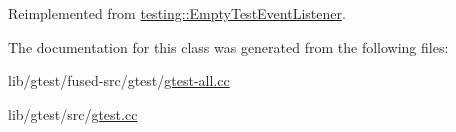 Reimplemented from \hyperlink{classtesting_1_1_empty_test_event_listener_a2253e5a18b3cf7bccd349567a252209d}{testing\-::\-Empty\-Test\-Event\-Listener}.



The documentation for this class was generated from the following files\-:\begin{DoxyCompactItemize}
\item 
lib/gtest/fused-\/src/gtest/\hyperlink{fused-src_2gtest_2gtest-all_8cc}{gtest-\/all.\-cc}\item 
lib/gtest/src/\hyperlink{gtest_8cc}{gtest.\-cc}\end{DoxyCompactItemize}
